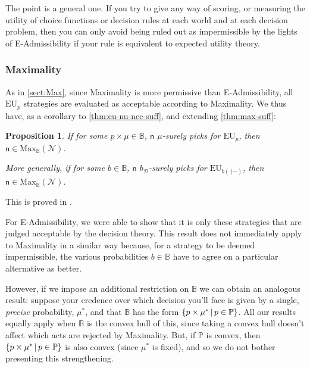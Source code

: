 \documentclass[a4paper]{article}
\newtheorem{proposition}[theorem]{Proposition}
\renewcommand\P{\mathbb{P}} %
\newcommand\EU{\mathrm{EU}}
\newcommand\Maximality{\mathrm{Max}}
\newcommand{\Decs}{\mathcal{D}}
\newcommand{\n}{\mathsf{n}}
\newcommand\Nu{\mathcal{N}}
\newcommand{\IB}{\mathbb{B}}
\newcommand{\IP}{\P}
\newcommand{\todoold}[2][]{\todo[backgroundcolor=white,bordercolor=orange!10,linecolor=gray!10, #1,caption={},textcolor=gray]{Pre-rev: #2}}
\newcommand{\todooldinfo}[2][]{\todoold[#1]{#2}}
\newcommand\SetDelimiter[1][]{
	\nonscript\,#1\vert \allowbreak \nonscript\,\mathopen{}}
\providecommand\given{\SetDelimiter}
\newenvironment{CCM rewritten}
{\begingroup\color{blue}} %
{\endgroup}              %
\begin{document}
	The point is a general one.  If you try to give any way of scoring, or measuring the utility of choice functions or decision rules at each world and at each decision problem, then you can only avoid being ruled out as impermissible by the lights of E-Admissibility if your rule is equivalent to expected utility theory. 


\subsubsection{Maximality}\label{sect:nu:Max}


As in \cref{sect:Max}, since Maximality is more permissive than E-Admissibility, all $\EU_p$ strategies are evaluated as acceptable according to Maximality. We thus have, as a corollary to \cref{thm:eu-nu-nec-suff}, and extending \cref{thm:max-suff}:
\begin{proposition}\label{thm:max-nu-suff}
		If for some $p\times\mu\in \IB$, $\n$ $\mu$-surely picks for $\EU_{p}$, then $\n\in\Maximality_\IB(\Nu)$. 
		
		More generally, if for some $b\in \IB$, $\n$ $b_\Decs$-surely picks for $\EU_{b(\cdot|-)}$, then $\n\in\Maximality_\IB(\Nu)$. 
\end{proposition}
This is proved in .

For E-Admissibility, we were able to show that it is only these strategies that are judged acceptable by the decision theory. This result does not immediately apply to Maximality in a similar way because, for a strategy to be deemed impermissible, the various probabilities $b\in \IB$ have to agree on a particular alternative as better.

However, if we impose an additional restriction on $\IB$ we can obtain an analogous result: suppose your credence over which decision you'll face is given by a single, \emph{precise} probability, $\mu^*$, and that $\IB$ has the form $\{p\times \mu^*\given p\in \IP\}$. All our results equally apply when $\IB$ is the convex hull of this, since taking a convex hull doesn't affect which acts are rejected by Maximality. But, if $\IP$ is convex, then $\{p\times\mu^*\given p\in\IP\}$ is also convex (since $\mu^*$ is fixed), and so we do not bother presenting this strengthening. 
\todoold{check!!!}
\end{document}
